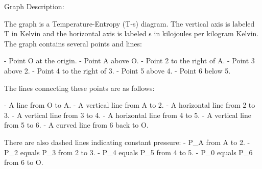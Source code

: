 Graph Description:

The graph is a Temperature-Entropy (T-s) diagram. The vertical axis is labeled T in Kelvin and the horizontal axis is labeled s in kilojoules per kilogram Kelvin. The graph contains several points and lines:

- Point O at the origin.
- Point A above O.
- Point 2 to the right of A.
- Point 3 above 2.
- Point 4 to the right of 3.
- Point 5 above 4.
- Point 6 below 5.

The lines connecting these points are as follows:

- A line from O to A.
- A vertical line from A to 2.
- A horizontal line from 2 to 3.
- A vertical line from 3 to 4.
- A horizontal line from 4 to 5.
- A vertical line from 5 to 6.
- A curved line from 6 back to O.

There are also dashed lines indicating constant pressure:
- P_A from A to 2.
- P_2 equals P_3 from 2 to 3.
- P_4 equals P_5 from 4 to 5.
- P_0 equals P_6 from 6 to O.